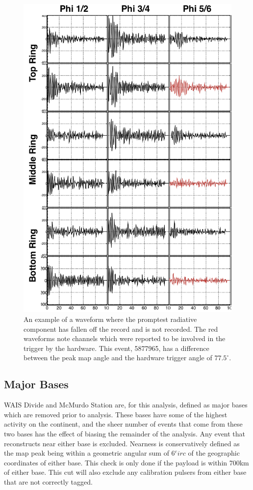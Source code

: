 \begin{figure}
	\centering
	\includegraphics[height=0.85\textheight]{figures/EarlyWaveform}
	\caption{An example of a waveform where the promptest radiative component has fallen off the record and is not recorded.  The red waveforms note channels which were reported to be involved in the trigger by the hardware.  This event, 5877965, has a difference between the peak map angle and the hardware trigger angle of $77.5^\circ$.} 
	\label{fig:earlyWaveform}
\end{figure}		


		
	\subsection{Major Bases}
		WAIS Divide and McMurdo Station are, for this analysis, defined as major bases which are removed prior to analysis.  These bases have some of the highest activity on the continent, and the sheer number of events that come from these two bases has the effect of biasing the remainder of the analysis.  Any event that reconstructs near either base is excluded.  Nearness is conservatively defined as the map peak being within a geometric angular sum of 6$^circ$ of the geographic coordinates of either base.  This check is only done if the payload is within 700km of either base.  This cut will also exclude any calibration pulsers from either base that are not correctly tagged.


